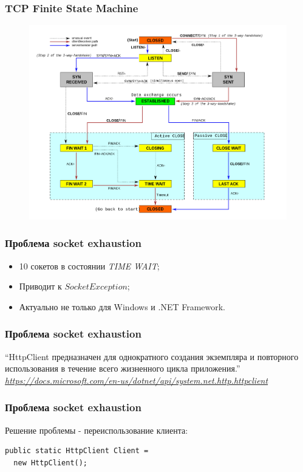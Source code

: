 \documentclass[17pt,aspectratio=169]{beamer}
\begin{document}
\begin{frame}
\frametitle{TCP Finite State Machine}
\begin{figure}
\includegraphics[scale=0.26]{timewait}
\end{figure}
\end{frame}

\begin{frame}
\frametitle{Проблема socket exhaustion}
\begin{itemize}
	\item <1-> 10 сокетов в состоянии \textit{TIME WAIT};
	\item <2-> Приводит к $SocketException$;
	\item <3-> Актуально не только для Windows и .NET Framework.
\end{itemize}
\end{frame}

\begin{frame}
\frametitle{Проблема socket exhaustion}
``HttpClient предназначен для однократного создания экземпляра и повторного использования в течение всего жизненного цикла приложения.''
\newline
\newline
\textit{\href{https://docs.microsoft.com/en-us/dotnet/api/system.net.http.httpclient}{https://docs.microsoft.com/en-us/dotnet/api/system.net.http.httpclient}}
\end{frame}

\begin{frame}[fragile]
\frametitle{Проблема socket exhaustion}
Решение проблемы - переиспользование клиента:
\newline
\begin{lstlisting}
public static HttpClient Client = 
  new HttpClient();
\end{lstlisting}
\end{frame}
\end{document}
